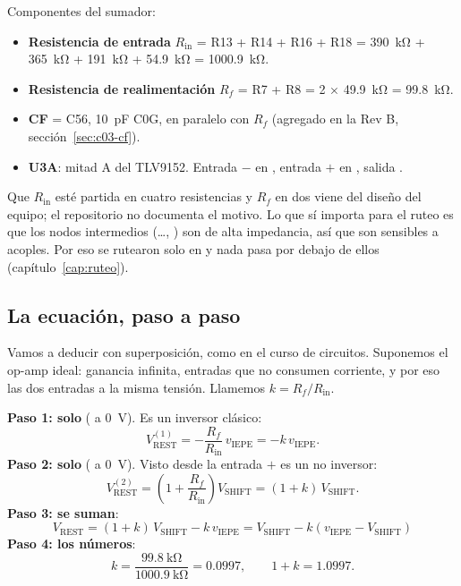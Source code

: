 Componentes del sumador:
\begin{itemize}
  \item \textbf{Resistencia de entrada} $R_{\mathrm{in}}$ = R13 + R14 + R16 + R18
        = \SI{390}{\kilo\ohm} + \SI{365}{\kilo\ohm} + \SI{191}{\kilo\ohm} + \SI{54.9}{\kilo\ohm} = \SI{1000.9}{\kilo\ohm}.
  \item \textbf{Resistencia de realimentación} $R_f$ = R7 + R8 = 2 × \SI{49.9}{\kilo\ohm} = \SI{99.8}{\kilo\ohm}.
  \item \textbf{CF} = C56, \SI{10}{\pico\farad} C0G, en paralelo con $R_f$ (agregado en la Rev B, sección~\ref{sec:c03-cf}).
  \item \textbf{U3A}: mitad A del TLV9152. Entrada $-$ en , entrada $+$ en , salida .
\end{itemize}

Que $R_{\mathrm{in}}$ esté partida en cuatro resistencias y $R_f$ en dos viene del diseño del equipo; el repositorio no
documenta el motivo. Lo que sí importa para el ruteo es que los nodos intermedios (…,
) son de alta impedancia, así que son sensibles a acoples. Por eso se rutearon solo en  y nada
pasa por debajo de ellos (capítulo~\ref{cap:ruteo}).

\subsection{La ecuación, paso a paso}

Vamos a deducir  con superposición, como en el curso de circuitos. Suponemos el op-amp ideal: ganancia
infinita, entradas que no consumen corriente, y por eso las dos entradas a la misma tensión. Llamemos
$k = R_f/R_{\mathrm{in}}$.

\begin{calculo}
\textbf{Paso 1: solo } ( a 0~V). Es un inversor clásico:
\begin{equation*}
  V_{\mathrm{REST}}^{(1)} = -\frac{R_f}{R_{\mathrm{in}}}\,v_{\mathrm{IEPE}} = -k\,v_{\mathrm{IEPE}}.
\end{equation*}
\textbf{Paso 2: solo } ( a 0~V). Visto desde la entrada $+$ es un no inversor:
\begin{equation*}
  V_{\mathrm{REST}}^{(2)} = \left(1 + \frac{R_f}{R_{\mathrm{in}}}\right) V_{\mathrm{SHIFT}} = (1+k)\,V_{\mathrm{SHIFT}}.
\end{equation*}
\textbf{Paso 3: se suman}:
\begin{equation}
  \boxed{V_{\mathrm{REST}} = (1+k)\,V_{\mathrm{SHIFT}} - k\,v_{\mathrm{IEPE}}
  = V_{\mathrm{SHIFT}} - k\left(v_{\mathrm{IEPE}} - V_{\mathrm{SHIFT}}\right)}
  \label{eq:c03-rest}
\end{equation}
\textbf{Paso 4: los números}:
\begin{equation*}
  k = \frac{\SI{99.8}{\kilo\ohm}}{\SI{1000.9}{\kilo\ohm}} = \num{0.0997}, \qquad 1+k = \num{1.0997}.
\end{equation*}
\end{calculo}

